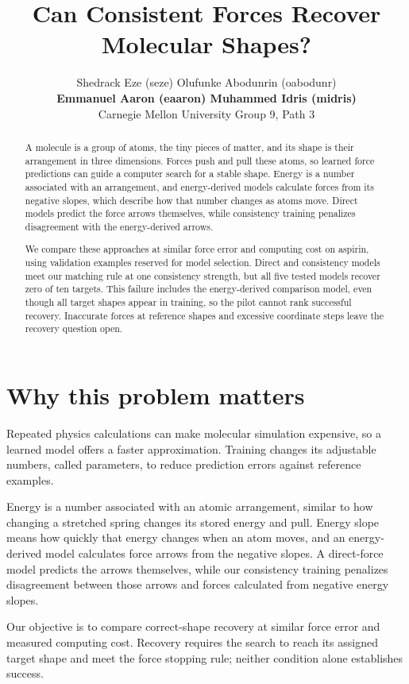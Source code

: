\documentclass{article}
\title{Can Consistent Forces Recover Molecular Shapes?}
\author{Shedrack Eze (seze) \quad Olufunke Abodunrin (oabodunr)\\
\textbf{Emmanuel Aaron (eaaron) \quad Muhammed Idris (midris)}\\
Carnegie Mellon University \quad Group 9, Path 3}
\begin{document}
\maketitle
\begin{abstract}
A molecule is a group of atoms, the tiny pieces of matter, and its shape is their arrangement in three dimensions. Forces push and pull these atoms, so learned force predictions can guide a computer search for a stable shape. Energy is a number associated with an arrangement, and energy-derived models calculate forces from its negative slopes, which describe how that number changes as atoms move. Direct models predict the force arrows themselves, while consistency training penalizes disagreement with the energy-derived arrows.

We compare these approaches at similar force error and computing cost on aspirin, using validation examples reserved for model selection. Direct and consistency models meet our matching rule at one consistency strength, but all five tested models recover zero of ten targets. This failure includes the energy-derived comparison model, even though all target shapes appear in training, so the pilot cannot rank successful recovery. Inaccurate forces at reference shapes and excessive coordinate steps leave the recovery question open.
\end{abstract}
\section{Why this problem matters}
Repeated physics calculations can make molecular simulation expensive, so a learned model offers a faster approximation. Training changes its adjustable numbers, called parameters, to reduce prediction errors against reference examples.

Energy is a number associated with an atomic arrangement, similar to how changing a stretched spring changes its stored energy and pull. Energy slope means how quickly that energy changes when an atom moves, and an energy-derived model calculates force arrows from the negative slopes. A direct-force model predicts the arrows themselves, while our consistency training penalizes disagreement between those arrows and forces calculated from negative energy slopes.

Our objective is to compare correct-shape recovery at similar force error and measured computing cost. Recovery requires the search to reach its assigned target shape and meet the force stopping rule; neither condition alone establishes success.
\end{document}
